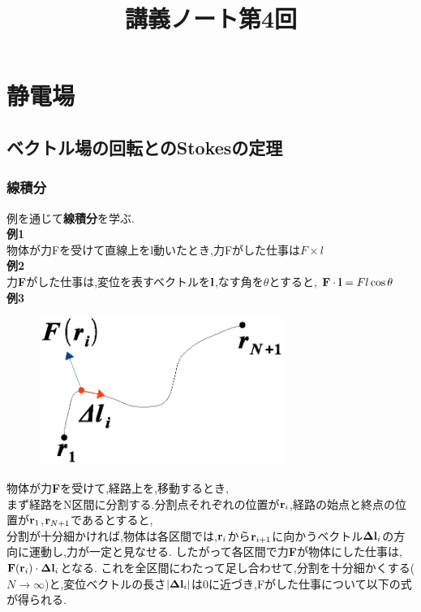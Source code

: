 \documentclass{jsarticle}
\title{講義ノート第4回}
\author{}
\date{}
\begin{document}
\maketitle

\section{静電場}

\setcounter{subsection}{9}

\subsection{ベクトル場の回転とのStokesの定理}
\subsubsection{線積分}
例を通じて{\bf 線積分}を学ぶ.\\

{\bf 例1}\\
物体が力Fを受けて直線上をl動いたとき,力Fがした仕事は$F \times l$ \\

{\bf 例2}\\
力{\bf F}がした仕事は,変位を表すベクトルを${\bf l}$,なす角を$\theta$とすると,
${\bf F} \cdot {\bf l}=Fl \cos \theta$ \\

{\bf 例3}\\
\begin{figure}[htbp]
 \begin{center}
  \includegraphics[width=80mm]{4.1.eps}
 \end{center}
 \caption{}
 \label{fig:one}
\end{figure}
物体が力{\bf F}を受けて,経路上を,移動するとき,\\
まず経路をN区間に分割する.分割点それぞれの位置が${\bf r}_i$,経路の始点と終点の位置が${\bf r}_1$,${\bf r}_{N+1}$であるとすると, \\
分割が十分細かければ,物体は各区間では,${\bf r}_i$から${\bf r}_{i+1}$に向かうベクトル${\bf \Delta l}_i$の方向に運動し,力が一定と見なせる.
したがって各区間で力{\bf F}が物体にした仕事は,${\bf F}({\bf r}_i) \cdot {\bf \Delta l}_i$となる.
これを全区間にわたって足し合わせて,分割を十分細かくする($N \to \infty$)と,変位ベクトルの長さ$|{\bf \Delta l}_i|$は0に近づき,Fがした仕事について以下の式が得られる.
\end{document}
